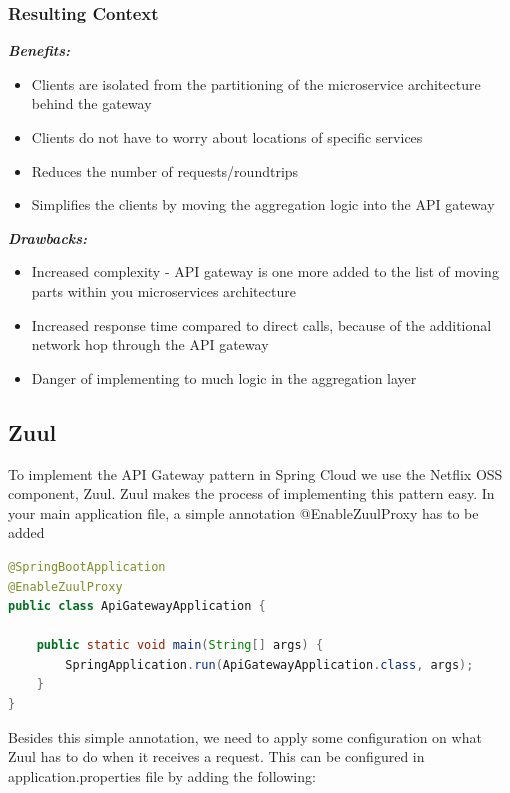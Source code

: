 \subsubsection*{Resulting Context}   
\textbf{\textit{Benefits:}}
\begin{itemize}
    \setlength\itemsep{0.05em}
  \item Clients are isolated from the partitioning of the microservice architecture behind the gateway
  \item Clients do not have to worry about locations of specific services
  \item Reduces the number of requests/roundtrips
  \item Simplifies the clients by moving the aggregation logic into the API gateway
\end{itemize}

\noindent\textbf{\textit{Drawbacks:}}
\begin{itemize}
    \setlength\itemsep{0.05em}
  \item Increased complexity - API gateway is one more added to the list of moving parts within you microservices architecture
  \item Increased response time compared to direct calls, because of the additional network hop through the API gateway
  \item Danger of implementing to much logic in the aggregation layer
\end{itemize}

\subsection*{Zuul}
To implement the API Gateway pattern in Spring Cloud we use the Netflix OSS component, Zuul. Zuul makes the process of implementing this pattern easy. In your main application file, a simple annotation @EnableZuulProxy has to be added 

\begin{lstlisting}[language=Java]
@SpringBootApplication
@EnableZuulProxy
public class ApiGatewayApplication {

    public static void main(String[] args) {
        SpringApplication.run(ApiGatewayApplication.class, args);
    }
}
\end{lstlisting}

\noindent Besides this simple annotation, we need to apply some configuration on what Zuul has to do when it receives a request. This can be configured in application.properties file by adding the following:


